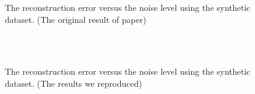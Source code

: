 \documentclass{article}
\begin{document}
{\begin{figure}[htbp]
    \caption{ The reconstruction error versus the noise level using the synthetic dataset. (The original result of paper)\label{fig2ori}}
\end{figure}
\begin{figure}[htbp]
    \centering
    \quad\quad
    \\
    \quad\quad
    \\
    \caption{ The reconstruction error versus the noise level using the synthetic dataset. (The results we reproduced)\label{fig2}}
\end{figure}

}
\end{document}
